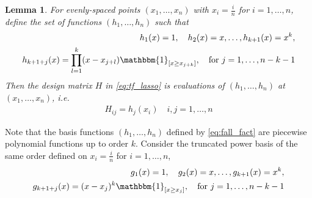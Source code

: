 \documentclass[a4paper]{article}
\newtheorem{lemma}[theorem]{Lemma}
\begin{document}
\begin{lemma}
For evenly-spaced points $(x_1,\ldots, x_n)$ with $x_i = \frac{i}{n}$ for $i=1,\ldots, n$, define the set of functions $(h_1, \ldots, h_n)$ such that
\begin{equation}
\begin{aligned}
h_1(x) = 1, \quad h_2(x) = x, \ldots, h_{k+1}(x) = x^k,\\
h_{k+1+j}(x) = \prod_{l=1}^k (x-x_{j+l})\mathbbm{1}_{[x\geq x_{j+k}]}, \quad \text{for } j = 1,\ldots, n-k-1
\label{eq:fall_fact}
\end{aligned}
\end{equation}
Then the design matrix $H$ in \eqref{eq:tf_lasso} is evaluations of $(h_1,\ldots, h_n)$ at $(x_1,\ldots, x_n)$, i.e.
\begin{align*}
H_{ij} = h_j(x_i) \quad i,j=1,\ldots, n
\end{align*}
\end{lemma}
Note that the basis functions $(h_1,\ldots, h_n)$ defined by \eqref{eq:fall_fact} are piecewise polynomial functions up to order $k$. Consider the truncated power basis of the same order defined on $x_i = \frac{i}{n}$ for $i= 1,\ldots, n$,
\begin{equation}
\begin{aligned}
g_1(x) = 1, \quad g_2(x) = x, \ldots, g_{k+1}(x) = x^k,\\
g_{k+1+j}(x) = (x-x_j)^k\mathbbm{1}_{[x\geq x_j]}, \quad \text{for }j=1,\ldots, n-k-1
\label{eq:trun_basis}
\end{aligned}
\end{equation}
\end{document}

